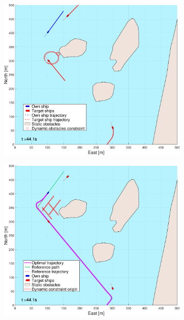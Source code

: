 \begin{figure}[!ht] %
    \begin{subfigure}[b]{0.494\textwidth}
        \centering
        \includegraphics[width=\textwidth]{Images/NewFigures/Helloya_Rev/_Simple_0fig1_time=45}
        \subcaption{}
    \end{subfigure}
    \hfill
    \begin{subfigure}[b]{0.494\textwidth}
        \centering
        \includegraphics[width=\textwidth]{Images/NewFigures/Helloya_Rev/_Simple_0fig999_time=45}

\end{subfigure}
\end{figure}
